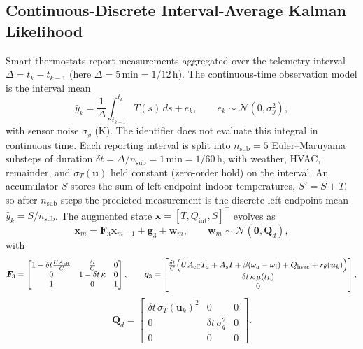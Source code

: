 \documentclass[11pt,letterpaper]{article}
\begin{document}
\subsection{Continuous-Discrete Interval-Average Kalman Likelihood}
\label{sec:model-obs}
Smart thermostats report measurements aggregated over the telemetry interval $\Delta = t_k - t_{k-1}$ (here $\Delta = 5\,\mathrm{min} = 1/12\,\mathrm{h}$). The continuous-time observation model is the interval mean
\begin{equation}
\label{eq:obs}
\bar{y}_k = \frac{1}{\Delta}\int_{t_{k-1}}^{t_k} T(s)\,ds + e_k, \qquad e_k \sim \mathcal{N}(0, \sigma_y^2),
\end{equation}
with sensor noise $\sigma_y$ ($\mathrm{K}$). The identifier does not evaluate this integral in continuous time. Each reporting interval is split into $n_\mathrm{sub}=5$ Euler--Maruyama substeps of duration $\delta t = \Delta/n_\mathrm{sub} = 1\,\mathrm{min} = 1/60\,\mathrm{h}$, with weather, HVAC, remainder, and $\sigma_T(\bm{u})$ held constant (zero-order hold) on the interval. An accumulator $S$ stores the sum of left-endpoint indoor temperatures, $S' = S + T$, so after $n_\mathrm{sub}$ steps the predicted measurement is the discrete left-endpoint mean $\hat{y}_k = S/n_\mathrm{sub}$. The augmented state $\bm{x} = [T, Q_\mathrm{int}, S]^\top$ evolves as
\begin{equation}
\label{eq:augmented-em}
\bm{x}_{m} = \bm{F}_3 \bm{x}_{m-1} + \bm{g}_3 + \bm{w}_m, \qquad \bm{w}_m \sim \mathcal{N}(\bm{0}, \bm{Q}_d),
\end{equation}
with
\begin{equation}
\label{eq:F3}
\bm{F}_3 = \begin{bmatrix} 1 - \delta t \frac{UA_\mathrm{eff}}{C} & \frac{\delta t}{C} & 0 \\ 0 & 1 - \delta t\,\kappa & 0 \\ 1 & 0 & 1 \end{bmatrix}, \qquad
\bm{g}_3 = \begin{bmatrix} \frac{\delta t}{C}\Bigl( UA_\mathrm{eff}T_a + A_s I + \beta(\omega_a - \omega_i) + Q_\mathrm{hvac} + r_\theta(\bm{u}_k) \Bigr) \\ \delta t\,\kappa\,\mu(t_k) \\ 0 \end{bmatrix},
\end{equation}
\begin{equation}
\bm{Q}_d = \begin{bmatrix} \delta t\,\sigma_T(\bm{u}_k)^2 & 0 & 0 \\ 0 & \delta t\,\sigma_q^2 & 0 \\ 0 & 0 & 0 \end{bmatrix}.
\end{equation}
\end{document}
